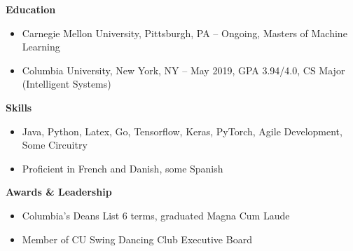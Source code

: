 \documentclass{article}
\begin{document}

\noindent
{\large\textbf{Education}}
\begin{itemize}[noitemsep]
    \item Carnegie Mellon University, Pittsburgh, PA -- Ongoing, Masters of Machine Learning
    \item Columbia University, New York, NY -- May 2019, GPA 3.94/4.0, CS Major (Intelligent Systems)
\end{itemize}

\noindent
{\large\textbf{Skills}}
\begin{itemize}[noitemsep]
    \item Java, Python, Latex, Go, Tensorflow, Keras, PyTorch, Agile Development, Some Circuitry
    \item Proficient in French and Danish, some Spanish
\end{itemize}
\noindent
{\large\textbf{Awards \& Leadership}}
\begin{itemize}[noitemsep]
    \item Columbia's Deans List 6 terms, graduated Magna Cum Laude
    \item Member of CU Swing Dancing Club Executive Board

\end{itemize}
\end{document}

